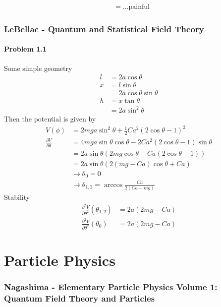 \documentclass[10pt,a4paper]{book}
\theoremstyle{definition}
\begin{document}
\begin{align}
[M_{\mu\nu},M_{\rho,\sigma}]
&=...\text{painful}
\end{align}

\subsection{{\sc LeBellac} - Quantum and Statistical Field Theory}
\subsubsection{Problem 1.1}
Some simple geometry
\begin{align}
l&=2a\cos\theta\\
x&=l\sin\theta\\
&=2a\cos\theta\sin\theta\\
h&=x\tan\theta\\
&=2a\sin^2\theta
\end{align}
Then the potential is given by
\begin{align}
V(\phi)
&=2mga\sin^2\theta+\frac{1}{2}Ca^2(2\cos\theta-1)^2\\
\frac{\partial V}{\partial\theta}
&=4mga\sin\theta\cos\theta-2Ca^2(2\cos\theta-1)\sin\theta\\
&=2a\sin\theta\left(2mg\cos\theta-Ca(2\cos\theta-1)\right)\\
&=2a\sin\theta\left(2(mg-Ca)\cos\theta+Ca\right)\\
&\rightarrow\theta_0=0\\
&\rightarrow\theta_{1,2}=\arccos\frac{Ca}{2(Ca-mg)}
\end{align}
Stability
\begin{align}
\frac{\partial^2 V}{\partial\theta^2}(\theta_{1,2})
&=2a(2mg-Ca)\\
\frac{\partial^2 V}{\partial\theta^2}(\theta_{0})
&=2a(2mg-Ca)
\end{align}

\newpage
\chapter{Particle Physics}
\subsection{{\sc Nagashima} - Elementary Particle Physics Volume 1: Quantum Field Theory and Particles}
\end{document}
